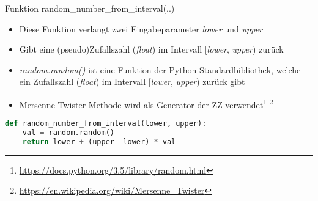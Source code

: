 \begin{frame}[fragile]{Funktion random\_number\_from\_interval(..)}
  \begin{itemize}
    \item Diese Funktion verlangt zwei Eingabeparameter \textit{lower} und \textit{upper}
    \item Gibt eine (pseudo)Zufallszahl (\textit{float}) im Intervall  [\textit{lower}, \textit{upper}) zurück 
    \item \textit{random.random()} ist eine Funktion der Python Standardbibliothek, welche ein Zufallszahl (\textit{float}) im Intervall [\textit{lower}, \textit{upper}) zurück gibt
    \item Mersenne Twister Methode wird als Generator der ZZ verwendet\footnote[frame] {\scriptsize\url{https://docs.python.org/3.5/library/random.html}} \footnote[frame] {\scriptsize\url{https://en.wikipedia.org/wiki/Mersenne_Twister}}
  \end{itemize}
  \begin{lstlisting}[language=python]
def random_number_from_interval(lower, upper):
    val = random.random()
    return lower + (upper -lower) * val
\end{lstlisting}
\logopythonbottom
\end{frame}	